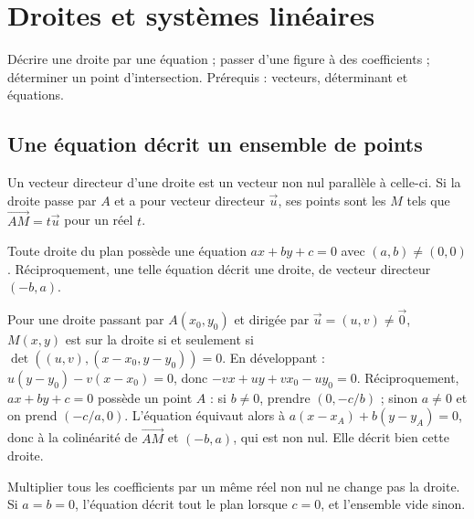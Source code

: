 \documentclass[../cours_2de.tex]{subfiles}
\begin{document}
\setcounter{chapter}{9}
\chapter{Droites et systèmes linéaires}
\label{sec:ch10}
\begin{objectif}
Décrire une droite par une équation ; passer d'une figure à des coefficients ; déterminer un point d'intersection. Prérequis : vecteurs, déterminant et équations.
\end{objectif}
\section{Une équation décrit un ensemble de points}
Un vecteur directeur d'une droite est un vecteur non nul parallèle à celle-ci.
Si la droite passe par $A$ et a pour vecteur directeur $\vec u$, ses points sont les $M$ tels que $\overrightarrow{AM}=t\vec u$ pour un réel $t$.
\begin{theoreme}
Toute droite du plan possède une équation $ax+by+c=0$ avec $(a,b)\ne(0,0)$.
Réciproquement, une telle équation décrit une droite, de vecteur directeur $(-b,a)$.
\end{theoreme}
\begin{demonstration}
Pour une droite passant par $A(x_0,y_0)$ et dirigée par $\vec u=(u,v)\ne\vec0$,
$M(x,y)$ est sur la droite si et seulement si
$\det((u,v),(x-x_0,y-y_0))=0$.
En développant : $u(y-y_0)-v(x-x_0)=0$, donc
$-vx+uy+vx_0-uy_0=0$.
Réciproquement, $ax+by+c=0$ possède un point $A$ :
si $b\ne0$, prendre $(0,-c/b)$ ; sinon $a\ne0$ et on prend $(-c/a,0)$.
L'équation équivaut alors à $a(x-x_A)+b(y-y_A)=0$, donc à la colinéarité de $\overrightarrow{AM}$ et $(-b,a)$, qui est non nul. Elle décrit bien cette droite.
\end{demonstration}
Multiplier tous les coefficients par un même réel non nul ne change pas la droite.
Si $a=b=0$, l'équation décrit tout le plan lorsque $c=0$, et l'ensemble vide sinon.
\end{document}
